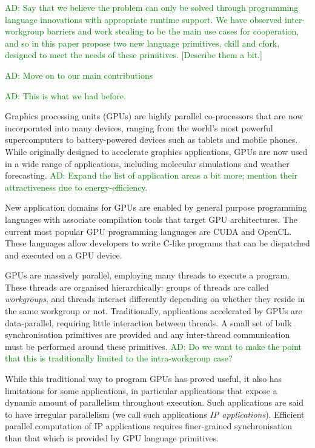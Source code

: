 \documentclass[nocopyrightspace]{sigplanconf-pldi16}
\newcommand{\ADComment}[1]{\textcolor{green}{AD: #1}}
\begin{document}
\ADComment{Say that we believe the problem can only be solved through
  programming language innovations with appropriate runtime support.
  We have observed inter-workgroup barriers and work stealing to be
  the main use cases for cooperation, and so in this paper propose two
  new language primitives, ckill and cfork, designed to meet the needs
  of these primitives.  [Describe them a bit.]}

\ADComment{Move on to our main contributions}

\ADComment{This is what we had before.}

Graphics processing units (GPUs) are highly parallel co-processors that are now incorporated into many
devices, ranging from the world's most powerful supercomputers to battery-powered devices such as tablets and mobile phones. While
originally designed to accelerate graphics applications, GPUs are now
used in a wide range of applications, including molecular simulations
and weather forecasting. \ADComment{Expand the list of application areas a bit more; mention their attractiveness due to energy-efficiency.}

New application domains for GPUs are enabled by general purpose
programming languages with associate compilation tools that target GPU architectures.
The current most popular GPU programming languages are CUDA and OpenCL. These languages allow developers to
write C-like programs that can be dispatched and executed on a GPU
device.

GPUs are massively parallel, employing many threads to execute a
program.  These threads are organised hierarchically: groups of threads
are called \emph{workgroups}, and threads interact differently depending on whether they reside in the same workgroup or not.  Traditionally, applications accelerated by GPUs are
data-parallel, requiring little interaction between threads. A small
set of bulk synchronisation primitives are provided and any
inter-thread communication must be performed around these primitives.  \ADComment{Do we want to make the point that this is traditionally limited to the intra-workgroup case?}

While this traditional way to program GPUs has proved useful, it also
has limitations for some applications, in particular applications that
expose a dynamic amount of parallelism throughout execution. Such
applications are said to have irregular parallelism (we call such
applications \emph{IP applications}). Efficient parallel computation
of IP applications requires finer-grained synchronisation than that
which is provided by GPU language primitives.
\end{document}

